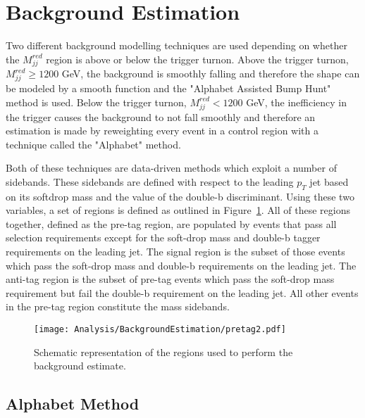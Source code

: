 \section{Background Estimation}
\label{sec:BkgEst}

Two different background modelling techniques are used depending on whether the $M_{jj}^{red}$ region is above or below the trigger turnon. Above the trigger turnon, $M_{jj}^{red} \ge 1200$ GeV, the background is smoothly falling and therefore the shape can be modeled by a smooth function and the "Alphabet Assisted Bump Hunt" method is used. Below the trigger turnon, $M_{jj}^{red} < 1200$ GeV, the inefficiency in the trigger causes the background to not fall smoothly and therefore an estimation is made by reweighting every event in a control region with a technique called the "Alphabet" method.

Both of these techniques are data-driven methods which exploit a number of sidebands. These sidebands are defined with respect to the leading $p_{T}$ jet based on its softdrop mass and the value of the double-b discriminant. Using these two variables, a set of regions is defined as outlined in Figure~\ref{fig:ABCDEFregions}. All of these regions together, defined as the pre-tag region, are populated by events that pass all selection requirements except for the soft-drop mass and double-b tagger requirements on the leading jet. The signal region is the subset of those events which pass the soft-drop mass and double-b requirements on the leading jet. The anti-tag region is the subset of pre-tag events which pass the soft-drop mass requirement but fail the double-b requirement on the leading jet. All other events in the pre-tag region constitute the mass sidebands. 

\begin{figure}[H]
  \centering
    \texttt{[image: Analysis/BackgroundEstimation/pretag2.pdf]}
  \caption{Schematic representation of the regions used to perform the background estimate.} \label{fig:ABCDEFregions}
\end{figure}

\subsection{Alphabet Method}

